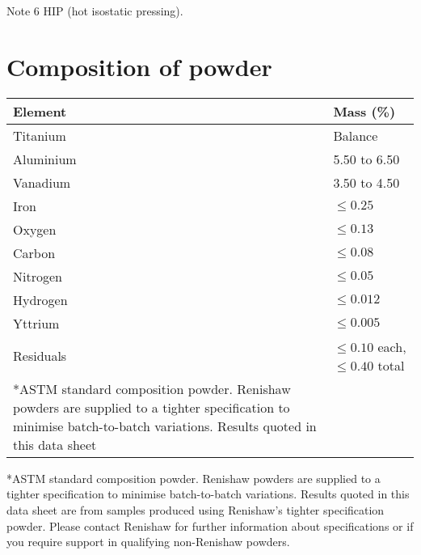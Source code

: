 \documentclass[10pt]{article}
\begin{document}
Note 6 HIP (hot isostatic pressing).

\section*{Composition of powder}
\begin{center}
\begin{tabular}{|l|l|}
\hline
Element & Mass (\%) \\
\hline
Titanium & Balance \\
\hline
Aluminium & 5.50 to 6.50 \\
\hline
Vanadium & 3.50 to 4.50 \\
\hline
Iron & $\leq 0.25$ \\
\hline
Oxygen & $\leq 0.13$ \\
\hline
Carbon & $\leq 0.08$ \\
\hline
Nitrogen & $\leq 0.05$ \\
\hline
Hydrogen & $\leq 0.012$ \\
\hline
Yttrium & $\leq 0.005$ \\
\hline
Residuals & $\leq 0.10$ each, $\leq 0.40$ total \\
\hline
*ASTM standard composition powder. Renishaw powders are supplied to a tighter specification to minimise batch-to-batch variations. Results quoted in this data sheet &  \\
\hline
\end{tabular}
\end{center}

*ASTM standard composition powder. Renishaw powders are supplied to a tighter specification to minimise batch-to-batch variations. Results quoted in this data sheet are from samples produced using Renishaw's tighter specification powder. Please contact Renishaw for further information about specifications or if you require support in qualifying non-Renishaw powders.
\end{document}
